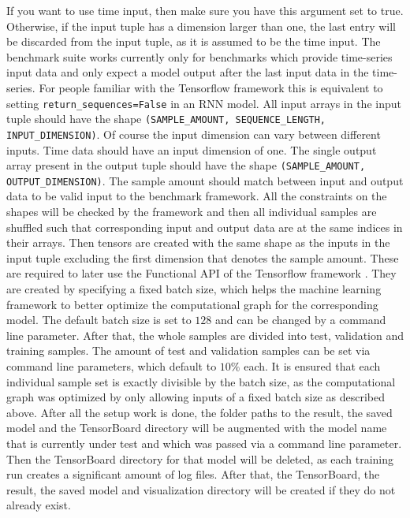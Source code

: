 \documentclass[draft,final]{vutinfth} %
\begin{document}
    If you want to use time input, then make sure you have this argument set to true.
    Otherwise, if the input tuple has a dimension larger than one, the last entry will be discarded from the input tuple, as it is assumed to be the time input.
    The benchmark suite works currently only for benchmarks which provide time-series input data and only expect a model output after the last input data in the time-series.
    For people familiar with the Tensorflow framework \cite{Tensorflow} this is equivalent to setting \texttt{return\_sequences=False} in an RNN model.
    All input arrays in the input tuple should have the shape \texttt{(SAMPLE\_AMOUNT, SEQUENCE\_LENGTH, INPUT\_DIMENSION)}.
    Of course the input dimension can vary between different inputs. Time data should have an input dimension of one. 
    The single output array present in the output tuple should have the shape \texttt{(SAMPLE\_AMOUNT, OUTPUT\_DIMENSION)}.
    The sample amount should match between input and output data to be valid input to the benchmark framework.
    All the constraints on the shapes will be checked by the framework and then all individual samples are shuffled such that corresponding input and output data are at the same indices in their arrays.
    Then tensors are created with the same shape as the inputs in the input tuple excluding the first dimension that denotes the sample amount.
    These are required to later use the Functional API of the Tensorflow framework \cite{Tensorflow}.
    They are created by specifying a fixed batch size, which helps the machine learning framework to better optimize the computational graph for the corresponding model.
    The default batch size is set to $128$ and can be changed by a command line parameter.
    After that, the whole samples are divided into test, validation and training samples. The amount of test and validation samples can be set via command line parameters, which default to $10\%$ each. 
    It is ensured that each individual sample set is exactly divisible by the batch size, as the computational graph was optimized by only allowing inputs of a fixed batch size as described above.
    After all the setup work is done, the folder paths to the result, the saved model and the TensorBoard directory will be augmented with the model name that is currently under test and which was passed via a command line parameter.
    Then the TensorBoard directory for that model will be deleted, as each training run creates a significant amount of log files.
    After that, the TensorBoard, the result, the saved model and visualization directory will be created if they do not already exist. 
\end{document}
